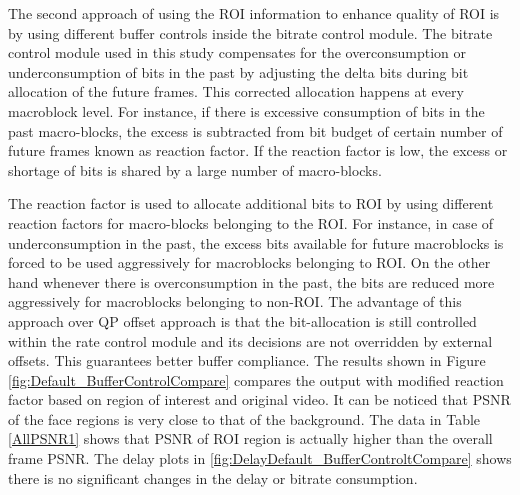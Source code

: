 \documentclass[11pt]{article} %
\begin{document}
The second approach of using the ROI information to enhance quality of ROI is by using different buffer controls inside the bitrate control module. The bitrate control module used in this study compensates for the overconsumption or underconsumption of bits in the past by adjusting the delta bits during bit allocation of the future frames. This corrected allocation happens at every macroblock level. For instance, if there is excessive consumption of bits in the past macro-blocks, the excess is subtracted from bit budget of certain number of future frames known as reaction factor. If the reaction factor is low, the excess or shortage of bits is shared by a large number of macro-blocks.

The reaction factor is used to allocate additional bits to ROI by using different reaction factors for macro-blocks belonging to the ROI. For instance, in case of underconsumption in the past, the excess bits available for future macroblocks is forced to be used aggressively for macroblocks belonging to ROI. On the other hand whenever there is overconsumption in the past, the bits are reduced more aggressively for macroblocks belonging to non-ROI. The advantage of this approach over QP offset approach is that the bit-allocation is still controlled within the rate control module and its decisions are not overridden by external offsets. This guarantees better buffer compliance. The results shown in Figure \ref{fig:Default_BufferControlCompare} compares the output with modified reaction factor based on region of interest and original video. It can be noticed that PSNR of the face regions is very close to that of the background. The data in Table \ref{AllPSNR1} shows that PSNR of ROI region is actually higher than the overall frame PSNR. The delay plots in \ref{fig:DelayDefault_BufferControltCompare} shows there is no significant changes in the delay or bitrate consumption.
%
%
%
%
%
\clearpage
\end{document}
